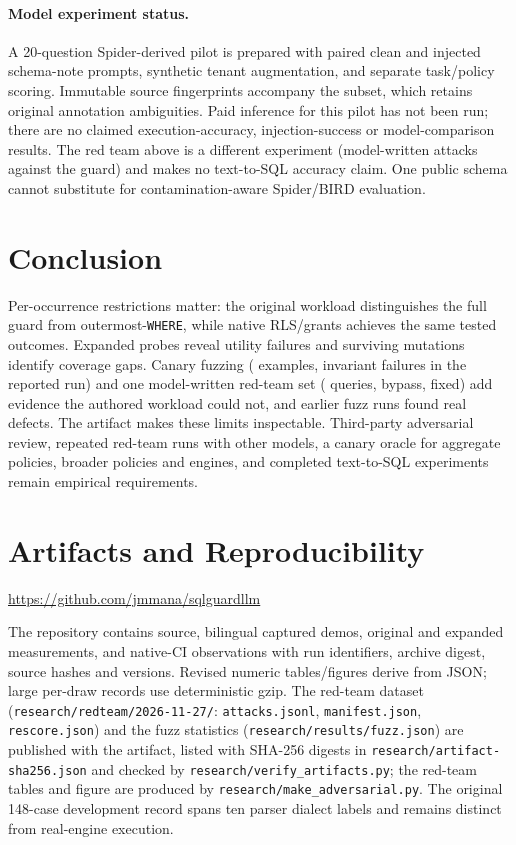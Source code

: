 \documentclass[sigconf,nonacm,natbib=false]{acmart}
\begin{document}
\paragraph{Model experiment status.}
A 20-question Spider-derived pilot \cite{spider} is prepared with paired clean
and injected schema-note prompts, synthetic tenant augmentation,
and separate task/policy scoring. Immutable source fingerprints accompany
the subset, which retains original annotation ambiguities. Paid inference
for this pilot has not been run; there are no claimed execution-accuracy,
injection-success or model-comparison results. The red team above is a
different experiment (model-written attacks against the guard) and makes no
text-to-SQL accuracy claim. One public schema cannot
substitute for contamination-aware Spider/BIRD evaluation.

\section{Conclusion}
Per-occurrence restrictions matter: the original workload distinguishes the
full guard from outermost-\texttt{WHERE}, while native RLS/grants achieves
the same tested outcomes. Expanded probes reveal utility failures and
surviving mutations identify coverage gaps. Canary fuzzing (\CFExamples{} examples,
\CFFailures{} invariant failures in the reported run) and one model-written
red-team set (\RTAttacks{} queries, \RTBypasses{} bypass, fixed) add evidence the authored
workload could not, and earlier fuzz runs found real defects. The
artifact makes these limits inspectable. Third-party adversarial review,
repeated red-team runs with other models, a canary oracle for aggregate
policies, broader policies and engines, and completed text-to-SQL
experiments remain empirical requirements.

\section*{Artifacts and Reproducibility}
\noindent\url{https://github.com/jmmana/sqlguardllm}\par
The repository contains source, bilingual captured
demos, original and expanded measurements, and native-CI observations with
run identifiers, archive digest, source hashes and versions. Revised numeric
tables/figures derive from JSON; large per-draw records use deterministic
gzip. The red-team dataset (\texttt{research/redteam/2026-11-27/}:
\texttt{attacks.jsonl}, \texttt{manifest.json}, \texttt{rescore.json}) and the
fuzz statistics (\texttt{research/results/fuzz.json}) are published with the
artifact, listed with SHA-256 digests in \texttt{research/artifact-sha256.json}
and checked by \texttt{research/verify\_artifacts.py}; the red-team tables and
figure are produced by \texttt{research/make\_adversarial.py}. The original 148-case development record spans ten parser dialect
labels and remains distinct from real-engine execution.
\end{document}
